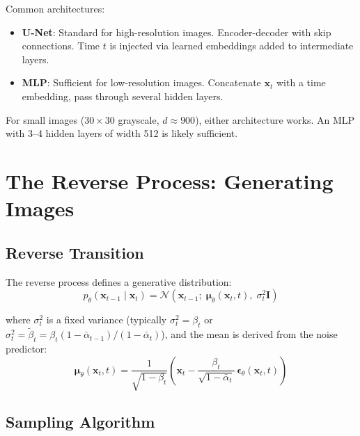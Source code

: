 \documentclass[11pt]{article}
\newcommand{\xb}{\mathbf{x}}
\newcommand{\eb}{\boldsymbol{\epsilon}}
\newcommand{\Ib}{\mathbf{I}}
\newcommand{\alphabar}{\bar{\alpha}}
\begin{document}
  Common architectures:
  \begin{itemize}[nosep]
      \item \textbf{U-Net}: Standard for high-resolution images. Encoder-decoder
            with skip connections. Time $t$ is injected via learned embeddings
            added to intermediate layers.
      \item \textbf{MLP}: Sufficient for low-resolution images. Concatenate
            $\xb_t$ with a time embedding, pass through several hidden layers.
  \end{itemize}

  For small images ($30 \times 30$ grayscale, $d \approx 900$), either
  architecture works. An MLP with 3--4 hidden layers of width 512 is
  likely sufficient.

  \section{The Reverse Process: Generating Images}

  \subsection{Reverse Transition}

  The reverse process defines a generative distribution:
  \begin{equation}
      p_\theta(\xb_{t-1} \mid \xb_t) = \mathcal{N}\!\left(
          \xb_{t-1};\; \boldsymbol{\mu}_\theta(\xb_t, t),\;
          \sigma_t^2 \Ib
      \right)
      \label{eq:reverse_step}
  \end{equation}

  where $\sigma_t^2$ is a fixed variance (typically $\sigma_t^2 = \beta_t$
  or $\sigma_t^2 = \tilde{\beta}_t = \beta_t (1 - \alphabar_{t-1})/(1 - \alphabar_t)$),
  and the mean is derived from the noise predictor:
  \begin{equation}
      \boldsymbol{\mu}_\theta(\xb_t, t)
      = \frac{1}{\sqrt{1 - \beta_t}} \left(
          \xb_t - \frac{\beta_t}{\sqrt{1 - \alphabar_t}}\,
          \eb_\theta(\xb_t, t)
      \right)
      \label{eq:reverse_mean}
  \end{equation}

  \subsection{Sampling Algorithm}
\end{document}
